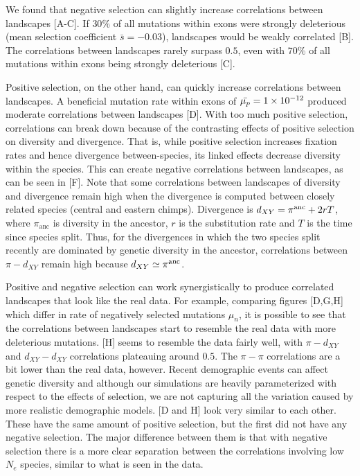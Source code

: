 We found that negative selection can slightly increase correlations between landscapes [A-C].
If $30\%$ of all mutations within exons were strongly deleterious (mean selection coefficient $\bar{s} = -0.03$),
landscapes would be weakly correlated [B].
The correlations between landscapes rarely surpass $0.5$, even with $70\%$ of all mutations within exons being strongly deleterious [C].

Positive selection, on the other hand, can quickly increase correlations between landscapes.
A beneficial mutation rate within exons of $\bar{\mu_p}={1}\times10^{-12}$
produced moderate correlations between landscapes [D].
With too much positive selection, 
correlations can break down because of the contrasting effects of positive selection on diversity and divergence.
That is, while positive selection increases fixation rates and hence divergence between-species, its linked effects decrease diversity within the species.
This can create negative correlations between landscapes, as can be seen in [F].
Note that some correlations between landscapes of diversity and divergence remain high 
when the divergence is computed between closely related species (\eg central and eastern chimps).
Divergence is $d_{XY} = \pi^{\mathrm{anc}} + 2rT$, 
where $\pi_{\mathrm{anc}}$ is diversity in the ancestor, $r$ is the substitution rate and $T$ is the time since species split.
Thus, for the divergences in which the two species split recently are dominated by genetic diversity in the ancestor, correlations between $\pi-d_{XY}$ remain high because $d_{XY} \simeq \pi^{\mathrm{anc}}$.

Positive and negative selection can work synergistically to produce correlated landscapes that look like the real data.
For example, comparing figures [D,G,H] which differ in rate of negatively selected mutations $\mu_n$,
it is possible to see that the correlations between landscapes start to resemble the real data with more deleterious mutations.
[H] seems to resemble the data fairly well, with $\pi-d_{XY}$ and $d_{XY}-d_{XY}$ correlations plateauing around $0.5$.
The $\pi-\pi$ correlations are a bit lower than the real data, however. 
Recent demographic events can affect genetic diversity and although our simulations are heavily parameterized with respect to the effects of selection,
we are not capturing all the variation caused by more realistic demographic models.
[D and H] look very similar to each other.
These have the same amount of positive selection, but the first did not have any negative selection.
The major difference between them is that with negative selection there is a more clear separation between the correlations involving low $N_e$ species,
similar to what is seen in the data.

